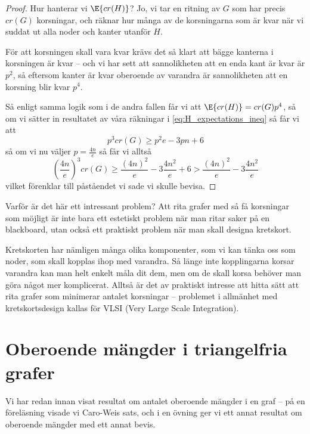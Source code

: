 \documentclass[nobib]{tufte-handout}
\begin{document}
\begin{theorem}
\begin{proof}
    Hur hanterar vi $\E{cr(H)}$? Jo, vi tar en ritning av $G$ som har precis $cr(G)$ korsningar, och räknar hur många av de korsningarna som är kvar när vi suddat ut alla noder och kanter utanför $H$.

    För att korsningen skall vara kvar krävs det så klart att bägge kanterna i korsningen är kvar -- och vi har sett att sannolikheten att en enda kant är kvar är $p^2$, så eftersom kanter är kvar oberoende av varandra är sannolikheten att en korsning blir kvar $p^4$.

    Så enligt samma logik som i de andra fallen får vi att $\E{cr(H)} = cr(G)p^4$, så om vi sätter in resultatet av våra räkningar i \eqref{eq:H_expectations_ineq} så får vi att
    $$p^3cr(G) \geq p^2e - 3pn + 6$$
    så om vi nu väljer $p = \frac{4n}{e}$ så får vi alltså
    $$\left(\frac{4n}{e}\right)^3cr(G) \geq \frac{(4n)^2}{e} - 3\frac{4n^2}{e} + 6 > \frac{(4n)^2}{e} - 3\frac{4n^2}{e}$$
    vilket förenklar till påståendet vi sade vi skulle bevisa.
  \end{proof}
\end{theorem}

Varför är det här ett intressant problem? Att rita grafer med så få korsningar som möjligt är inte bara ett estetiskt problem när man ritar saker på en blackboard, utan också ett praktiskt problem när man skall designa kretskort.

Kretskorten har nämligen många olika komponenter, som vi kan tänka oss som noder, som skall kopplas ihop med varandra. Så länge inte kopplingarna korsar varandra kan man helt enkelt måla dit dem, men om de skall korsa behöver man göra något mer komplicerat. Alltså är det av praktiskt intresse att hitta sätt att rita grafer som minimerar antalet korsningar -- problemet i allmänhet med kretskortsdesign kallas för VLSI (Very Large Scale Integration).

\section{Oberoende mängder i triangelfria grafer}

Vi har redan innan visat resultat om antalet oberoende mängder i en graf -- på en föreläsning visade vi Caro-Weis sats, och i en övning ger vi ett annat resultat om oberoende mängder med ett annat bevis.
\end{document}
